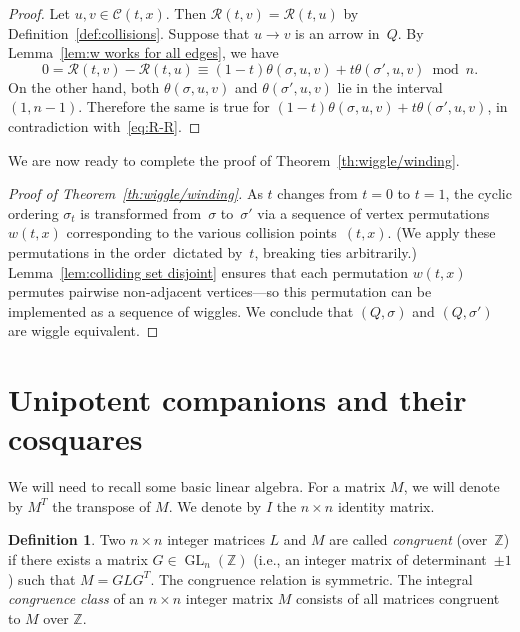 \documentclass[11pt, letterpaper]{amsart}
\theoremstyle{definition}
\newtheorem{definition}[theorem]{Definition}
\numberwithin{equation}{section}
\def\ZZ{{\mathbb Z}}
\begin{document}
\begin{proof}
Let $u,v\in\mathcal{C}(t,x)$. 
Then $\mathcal{R}(t,v) = \mathcal{R}(t,u)$ by Definition~\ref{def:collisions}. 
Suppose that $u \rightarrow v$ is an arrow in~$Q$. 
By Lemma~\ref{lem:w works for all edges}, we have
\begin{equation}
0 = \mathcal{R}(t,v) - \mathcal{R}(t,u) \equiv (1-t) \theta(\sigma,u,v) + t \theta(\sigma',u,v) \bmod n .
\label{eq:R-R}
\end{equation} %
On the other hand, both $\theta(\sigma,u,v)$ and $\theta(\sigma',u,v)$ lie in the interval $(1,n-1)$.  
Therefore the same is true for $(1-t) \theta(\sigma,u,v) + t \theta(\sigma',u,v)$, in contradiction with~\eqref{eq:R-R}. 
\end{proof}

We are now ready to complete the proof of Theorem~\ref{th:wiggle/winding}.

\begin{proof}[Proof of Theorem~\ref{th:wiggle/winding}]
As $t$ changes from $t=0$ to $t=1$, the 
cyclic ordering $\sigma_t$ is transformed from~$\sigma$ to~$\sigma'$ 
via a sequence of vertex permutations $w(t,x)$ corresponding to the various collision points~$(t,x)$.  
(We apply these permutations in the order~dictated by~$t$, breaking ties arbitrarily.) 
Lemma~\ref{lem:colliding set disjoint} ensures that
each permutation $w(t,x)$ permutes pairwise non-adjacent vertices---so 
this permutation can be implemented
as a sequence of wiggles. We conclude that $(Q,\sigma)$ and $(Q,\sigma')$ are wiggle equivalent. 
\end{proof}


\newpage



\section{Unipotent companions and their cosquares}
\label{sec:unipotent companions}
We will need to recall some basic linear algebra. 
For a matrix $M$, we will denote by $M^T$ the transpose of $M$. 
We denote by $I$ the $n \times n$ identity matrix. 

\begin{definition} 
Two $n\times n$ integer matrices $L$ and $M$ are called \emph{congruent} 
(over~$\ZZ$) 
if there exists a matrix $G\in \operatorname{GL}_n(\ZZ)$ 
(i.e., an integer matrix of determinant~$\pm1$) 
such that $M=GLG^T$. 
The congruence relation is symmetric. 
The integral \emph{congruence class} of an $n\times n$ integer matrix $M$ 
consists of all matrices congruent to $M$ over $\ZZ$. 
\end{definition}
\end{document}
